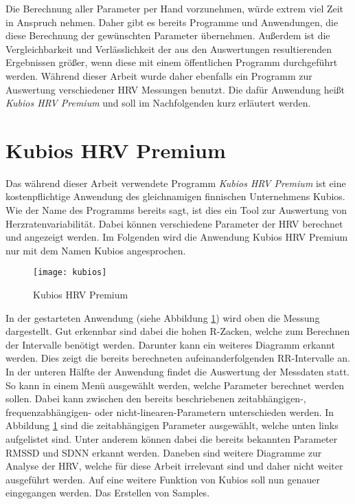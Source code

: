 Die Berechnung aller Parameter per Hand vorzunehmen, würde extrem viel Zeit in Anspruch nehmen. Daher gibt es bereits Programme und Anwendungen, die diese Berechnung der gewünschten Parameter übernehmen. Außerdem ist die Vergleichbarkeit und Verlässlichkeit der aus den Auswertungen resultierenden Ergebnissen größer, wenn diese mit einem öffentlichen Programm durchgeführt werden. Während dieser Arbeit wurde daher ebenfalls ein Programm zur Auswertung verschiedener HRV Messungen benutzt. Die dafür  Anwendung heißt \textit{Kubios HRV Premium} und soll im Nachfolgenden kurz erläutert werden. 

\section{Kubios HRV Premium}
Das während dieser Arbeit verwendete Programm \textit{Kubios HRV Premium} ist eine kostenpflichtige Anwendung des gleichnamigen finnischen Unternehmens Kubios. Wie der Name des Programms bereits sagt, ist dies ein Tool zur Auswertung von Herzratenvariabilität. Dabei können verschiedene Parameter der HRV berechnet und angezeigt werden.
Im Folgenden wird die Anwendung Kubios HRV Premium nur mit dem Namen Kubios angesprochen. 
 \begin{figure}[H]
	\centering
	\texttt{[image: kubios]}
	\caption{Kubios HRV Premium}
	\label{fig:kubios}
\end{figure}

In der gestarteten Anwendung (siehe Abbildung \ref{fig:kubios}) wird oben die Messung dargestellt. Gut erkennbar sind dabei die hohen R-Zacken, welche zum Berechnen der Intervalle benötigt werden. Darunter kann ein weiteres Diagramm erkannt werden. Dies zeigt die bereits berechneten aufeinanderfolgenden RR-Intervalle an. In der unteren Hälfte der Anwendung findet die Auswertung der Messdaten statt. So kann in einem Menü ausgewählt werden, welche Parameter berechnet werden sollen. Dabei kann zwischen den bereits beschriebenen zeitabhängigen-, frequenzabhängigen- oder nicht-linearen-Parametern unterschieden werden. In Abbildung \ref{fig:kubios} sind die zeitabhängigen Parameter ausgewählt, welche unten links aufgelistet sind. Unter anderem können dabei die bereits bekannten Parameter RMSSD und SDNN erkannt werden. Daneben sind weitere Diagramme zur Analyse der HRV, welche für diese Arbeit irrelevant sind und daher nicht weiter ausgeführt werden. Auf eine weitere Funktion von Kubios soll nun genauer eingegangen werden. Das Erstellen von Samples. \\

